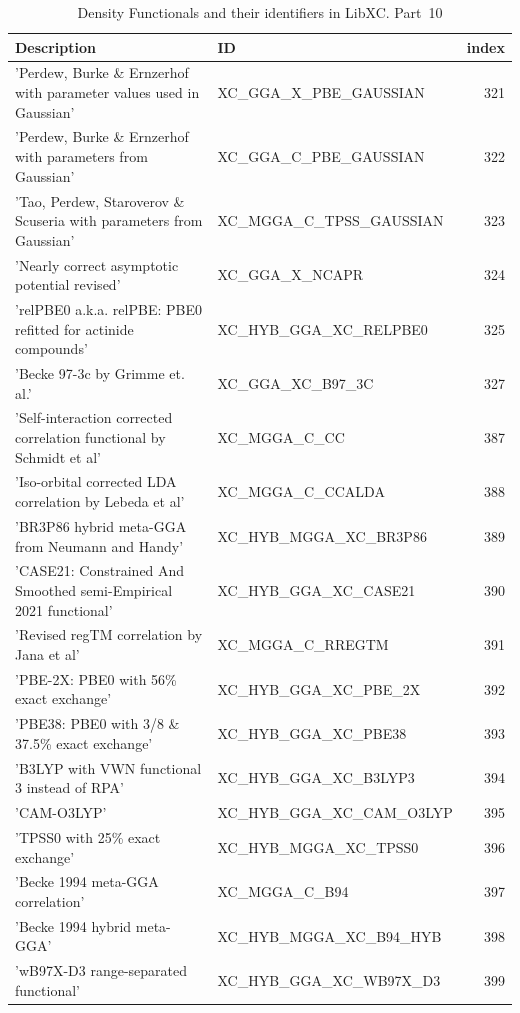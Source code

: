 \documentclass[final,12pt,makeidx,DIV=calc]{article}
\begin{document}
{{{{{{\begin{table}[!h]
\caption{Density Functionals and their identifiers in LibXC. Part~10}
\begin{center}
\begin{tabular}{llr}
\hline
\hline
Description & ID & index\\
\hline
  'Perdew, Burke \& Ernzerhof with parameter values used in Gaussian' & XC\_GGA\_X\_PBE\_GAUSSIAN  &321\\
  'Perdew, Burke \& Ernzerhof with parameters from Gaussian' & XC\_GGA\_C\_PBE\_GAUSSIAN  &322\\
  'Tao, Perdew, Staroverov \& Scuseria with parameters from Gaussian' & XC\_MGGA\_C\_TPSS\_GAUSSIAN  &323\\
  'Nearly correct asymptotic potential revised' & XC\_GGA\_X\_NCAPR  &324\\
  'relPBE0 a.k.a. relPBE: PBE0 refitted for actinide compounds' & XC\_HYB\_GGA\_XC\_RELPBE0  &325\\
  'Becke 97-3c by Grimme et. al.' & XC\_GGA\_XC\_B97\_3C  &327\\
  'Self-interaction corrected correlation functional by Schmidt et al' & XC\_MGGA\_C\_CC  &387\\
  'Iso-orbital corrected LDA correlation by Lebeda et al' & XC\_MGGA\_C\_CCALDA  &388\\
  'BR3P86 hybrid meta-GGA from Neumann and Handy' & XC\_HYB\_MGGA\_XC\_BR3P86  &389\\
  'CASE21: Constrained And Smoothed semi-Empirical 2021 functional' & XC\_HYB\_GGA\_XC\_CASE21  &390\\
  'Revised regTM correlation by Jana et al' & XC\_MGGA\_C\_RREGTM  &391\\
  'PBE-2X: PBE0 with 56\% exact exchange' & XC\_HYB\_GGA\_XC\_PBE\_2X  &392\\
  'PBE38: PBE0 with 3/8 \& 37.5\% exact exchange' & XC\_HYB\_GGA\_XC\_PBE38  &393\\
  'B3LYP with VWN functional 3 instead of RPA' & XC\_HYB\_GGA\_XC\_B3LYP3  &394\\
  'CAM-O3LYP' & XC\_HYB\_GGA\_XC\_CAM\_O3LYP  &395\\
  'TPSS0 with 25\% exact exchange' & XC\_HYB\_MGGA\_XC\_TPSS0  &396\\
  'Becke 1994 meta-GGA correlation' & XC\_MGGA\_C\_B94  &397\\
  'Becke 1994 hybrid meta-GGA' & XC\_HYB\_MGGA\_XC\_B94\_HYB  &398\\
  'wB97X-D3 range-separated functional' & XC\_HYB\_GGA\_XC\_WB97X\_D3  &399\\

\end{tabular}
\end{center}
\end{table}}}}}}}
\end{document}
